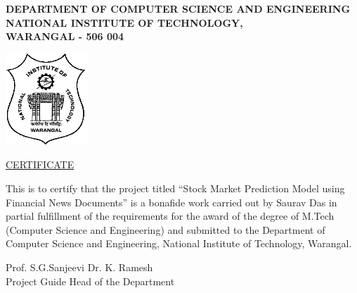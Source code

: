 \documentclass[a4paper,12bp]{report}
\begin{document}
\newpage
\begin{center}
\Large{\textbf{DEPARTMENT OF COMPUTER SCIENCE AND ENGINEERING\\
NATIONAL INSTITUTE OF TECHNOLOGY,\\
WARANGAL - 506 004}}

\vspace{10mm}
\includegraphics[scale=1]{pictures/nitw-logo.png}

\vspace{10mm}
\underline{CERTIFICATE}
\end{center}
\Large {
This is to certify that the project titled ``Stock Market Prediction Model using Financial News Documents'' is a bonafide work carried out by Saurav Das in partial fulfillment of the requirements for the award of the degree of M.Tech (Computer Science and Engineering) and submitted to the Department of Computer Science and Engineering, National Institute of Technology, Warangal.

\vspace{10mm}
\noindent Prof. S.G.Sanjeevi \hfill Dr. K. Ramesh\\
\noindent Project Guide \hfill Head of the Department
}


\newpage
\end{document}
